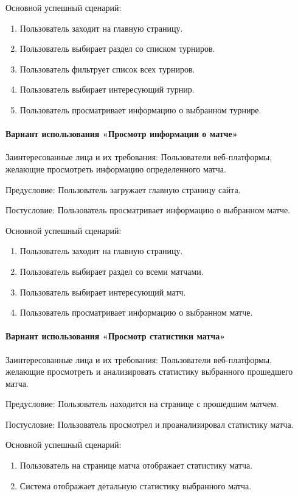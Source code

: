 Основной успешный сценарий:
\begin{enumerate}
	\item Пользователь заходит на главную страницу.
	\item Пользователь выбирает раздел со списком турниров.
	\item Пользователь фильтрует список всех турниров.
	\item Пользователь выбирает интересующий турнир.
	\item Пользователь просматривает информацию о выбранном турнире.
\end{enumerate}

\paragraph{Вариант использования «Просмотр информации о матче»}

Заинтересованные лица и их требования: Пользователи веб-платформы, желающие просмотреть информацию определенного матча.

Предусловие: Пользователь загружает главную страницу сайта.

Постусловие: Пользователь просматривает информацию о выбранном матче.

Основной успешный сценарий:
\begin{enumerate}
	\item Пользователь заходит на главную страницу.
	\item Пользователь выбирает раздел со всеми матчами.
	\item Пользователь выбирает интересующий матч.
	\item Пользователь просматривает информацию о выбранном матче.
\end{enumerate}

\paragraph{Вариант использования «Просмотр статистики матча»}

Заинтересованные лица и их требования: Пользователи веб-платформы, желающие просмотреть и анализировать статистику выбранного прошедшего матча.

Предусловие: Пользователь находится на странице с прошедшим матчем.

Постусловие: Пользователь просмотрел и проанализировал статистику матча.

Основной успешный сценарий:
\begin{enumerate}
	\item Пользователь на странице матча отображает статистику матча.
	\item Система отображает детальную статистику выбранного матча.
\end{enumerate}

